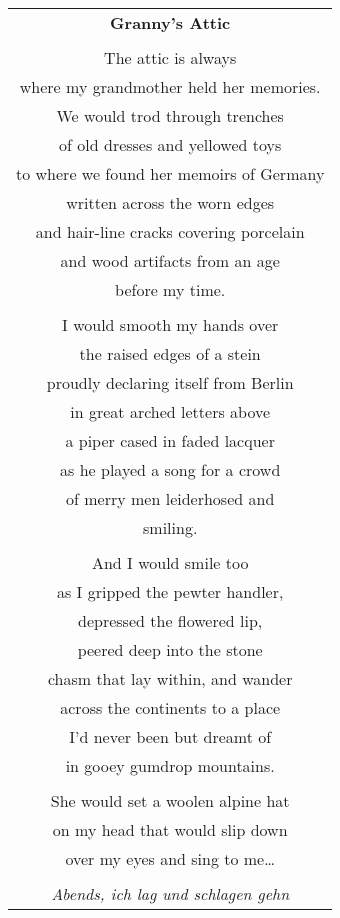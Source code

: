 \documentclass{article}
\begin{document}
\begin{center}
\begin{tabular}{c}
\textbf{Granny's Attic} \\
\\
The attic is always \\
where my grandmother held her memories. \\
We would trod through trenches \\
of old dresses and yellowed toys \\
to where we found her memoirs of Germany \\
written across the worn edges \\
and hair-line cracks covering porcelain \\
and wood artifacts from an age \\
before my time. \\
\\
I would smooth my hands over \\
the raised edges of a stein \\
proudly declaring itself from Berlin \\
in great arched letters above \\
a piper cased in faded lacquer \\
as he played a song for a crowd \\
of merry men leiderhosed and \\
smiling. \\
\\
And I would smile too \\
as I gripped the pewter handler, \\
depressed the flowered lip, \\
peered deep into the stone \\
chasm that lay within, and wander \\
across the continents to a place \\
I'd never been but dreamt of \\
in gooey gumdrop mountains. \\
\\
She would set a woolen alpine hat \\
on my head that would slip down \\
over my eyes and sing to me\ldots{} \\
\\
\textit{Abends, ich lag und schlagen gehn} \\

\end{tabular}
\end{center}
\end{document}
